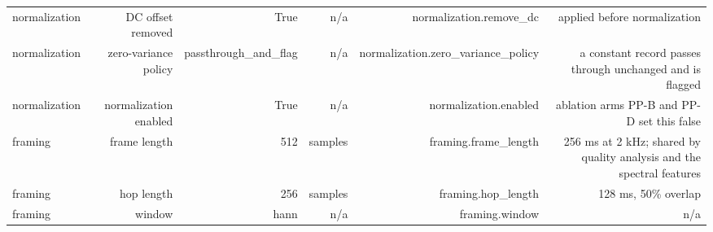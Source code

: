 \begin{table}[htbp]
\begin{tabular}{lrrrrr}
    normalization & DC offset removed & True & n/a & normalization.remove\_dc & applied before normalization \\
    normalization & zero-variance policy & passthrough\_and\_flag & n/a & normalization.zero\_variance\_policy & a constant record passes through unchanged and is flagged \\
    normalization & normalization enabled & True & n/a & normalization.enabled & ablation arms PP-B and PP-D set this false \\
    framing & frame length & 512 & samples & framing.frame\_length & 256 ms at 2 kHz; shared by quality analysis and the spectral features \\
    framing & hop length & 256 & samples & framing.hop\_length & 128 ms, 50\% overlap \\
    framing & window & hann & n/a & framing.window & n/a \\
    \bottomrule
  \end{tabular}
\end{table}
